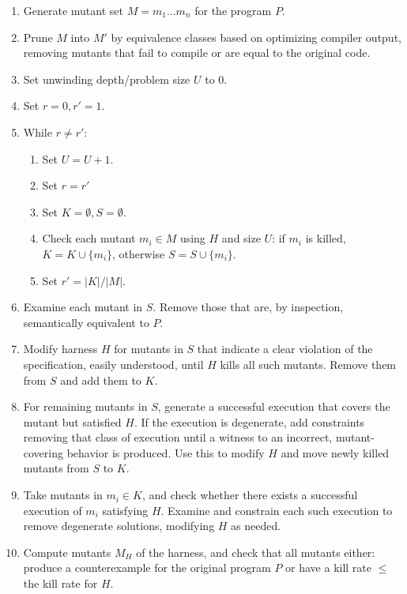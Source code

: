 \documentclass{svjour3}
\begin{document}
\begin{enumerate}
\item Generate mutant set $M = m_1 \ldots m_n$ for the program $P$.
\item Prune $M$ into $M'$ by equivalence classes based on optimizing
  compiler output, removing mutants that fail to compile or are equal
  to the original code.
\item Set unwinding depth/problem size $U$ to 0.
\item Set $r = 0, r' = 1$.
\item While $r \not= r'$:
\begin{enumerate}
\item Set $U = U + 1$.
\item Set $r = r'$
\item Set $K = \emptyset, S = \emptyset$.
\item Check each mutant $m_i \in M$ using $H$ and size $U$: if $m_i$ is killed, $K = K \cup
  \{m_i\}$, otherwise $S = S \cup \{m_i\}$.
\item Set $r' = |K| / |M|$.  
\end{enumerate}
\item Examine each mutant in $S$.  Remove those that are, by
  inspection, semantically equivalent to $P$.
\item Modify harness $H$ for mutants in $S$ that indicate a clear
  violation of the specification, easily understood, until $H$ kills
  all such mutants.  Remove them from $S$ and add them to $K$.
\item For remaining mutants in $S$, generate a successful execution
  that covers the mutant but satisfied $H$.  If the execution is
  degenerate, add constraints removing that class of execution until a
  witness to an incorrect, mutant-covering behavior is produced.  Use
  this to modify $H$ and move newly killed mutants from $S$ to $K$.
\item Take mutants in $m_i \in K$, and check whether there exists a successful
  execution of $m_i$ satisfying $H$.  Examine and constrain each such
  execution to remove degenerate solutions, modifying $H$ as needed.
\item Compute mutants $M_H$ of the harness, and check that all mutants
  either:  produce a counterexample for the original program $P$ or
  have a kill rate $\leq$ the kill rate for $H$.
\end{enumerate}

\end{document}
